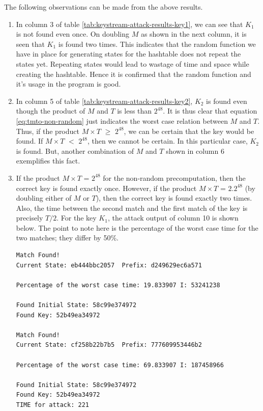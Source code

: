 The following observations can be made from the above results. 
\begin{enumerate}
\item In column 3 of table \ref{tab:keystream-attack-results-key1}, we can see that $K_1$ is not found even once. On doubling $M$ as shown in the next column, it is seen that $K_1$ is found two times. This indicates that the random function we have in place for generating states for the hashtable does not repeat the states yet. Repeating states would lead to wastage of time and space while creating the hashtable. Hence it is confirmed that the random function and it's usage in the program is good.

\item In column 5 of table \ref{tab:keystream-attack-results-key2}, $K_2$ is found even though the product of $M$ and $T$ is less than $2^{48}$. It is thus clear that equation \ref{eq:tmto-non-random} just indicates the worst case relation between $M$ and $T$. Thus, if the product $M \times T$ $\geq$ $2^{48}$, we can be certain that the key would be found. If $M \times T$ $<$ $2^{48}$, then we cannot be certain. In this particular case, $K_2$ is found. But, another combination of $M$ and $T$ shown in column 6 exemplifies this fact.

\item If the product $M \times T$ = $2^{48}$ for the non-random precomputation, then the correct key is found exactly once. However, if the product $M \times T$ = $2.2^{48}$ (by doubling either of $M$ or $T$), then the correct key is found exactly two times. Also, the time between the second match and the first match of the key is precisely $T/2$. For the key $K_1$, the attack output of column 10 is shown below. The point to note here is the percentage of the worst case time for the two matches; they differ by 50\%. 


\begin{lstlisting}[frame=tb]
Match Found! 
Current State: eb444bbc2057  Prefix: d249629ec6a571

Percentage of the worst case time: 19.833907 I: 53241238

Found Initial State: 58c99e374972
Found Key: 52b49ea34972

Match Found! 
Current State: cf258b22b7b5  Prefix: 777609953446b2

Percentage of the worst case time: 69.833907 I: 187458966

Found Initial State: 58c99e374972
Found Key: 52b49ea34972
TIME for attack: 221
\end{lstlisting}


\end{enumerate}
